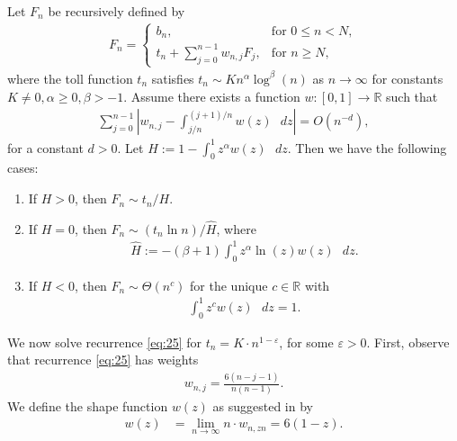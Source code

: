 \documentclass[prodmode,acmtalg]{acmsmall}
\begin{document}
\begin{theorem}
    Let $F_n$ be recursively defined by 
    \begin{align*}
        F_n = \begin{cases}
            b_n, & \text{for } 0 \leq n < N,\\
           t_n + \sum_{j=0}^{n-1}w_{n,j}F_j, & \text{for } n \geq N,
        \end{cases}
    \end{align*}
    where the toll function $t_n$ satisfies $t_n \sim K n^\alpha \log^\beta(n)$ as $n \rightarrow \infty$
    for constants $K \neq 0, \alpha \geq 0, \beta > -1$. Assume there exists a function $w\colon[0,1] \rightarrow \mathbb{R}$
    such that 
    \begin{align}\label{eq:cmt:shape:function}
        \sum_{j = 0}^{n-1} \left\vert w_{n,j} - \int_{j/n}^{(j+1)/n} w(z) \text{ $dz$} \right\vert = O(n^{-d}),
    \end{align}
    for a constant $d > 0$. Let $H:=1 - \int_0^1 z^\alpha w(z) \text{ $dz$}$. Then we have the 
    following cases:
    \begin{enumerate}
        \item If $H > 0$, then $F_n \sim t_n/H.$
        \item If $H = 0$, then $F_n \sim (t_n \ln n)/\hat{H}$, where
            \begin{align*}
                \hat{H} := - (\beta + 1) \int_0^1 z^\alpha \ln (z) w(z) \text{ $dz$}.
            \end{align*}
        \item If $H < 0$, then $F_n \sim \Theta(n^c)$ for the unique $c \in \mathbb{R}$ with 
            \begin{align*}
                \int_0^1 z^c w(z) \text{ $dz$} = 1.
            \end{align*}
    \end{enumerate}
    \label{thm:CMT}
\end{theorem}
We now solve recurrence \eqref{eq:25} for $t_n = K \cdot n^{1-\varepsilon}$, for some $\varepsilon > 0$. 
    First, observe that recurrence \eqref{eq:25} has weights
    \begin{align*}
        w_{n,j} = \frac{6(n - j - 1)}{n (n-1)}.
    \end{align*}
    We define the shape function $w(z)$ as suggested in \cite{Roura01} by
    \begin{align*}
        w(z) &= \lim_{n \rightarrow \infty} n \cdot w_{n, zn} = 6 (1 - z).
    \end{align*}
\end{document}
